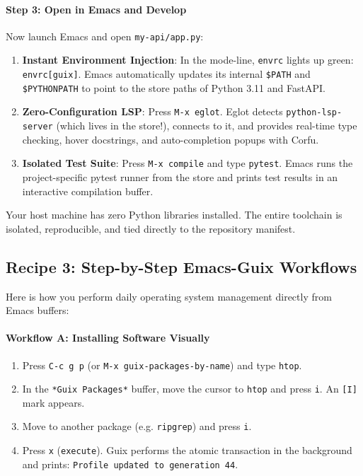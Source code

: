 \paragraph{Step 3: Open in Emacs and Develop}
Now launch Emacs and open \texttt{my-api/app.py}:
\begin{enumerate}
  \item \textbf{Instant Environment Injection}: In the mode-line, \texttt{envrc} lights up green: \texttt{envrc[guix]}. Emacs automatically updates its internal \texttt{\$PATH} and \texttt{\$PYTHONPATH} to point to the store paths of Python 3.11 and FastAPI.
  \item \textbf{Zero-Configuration LSP}: Press \texttt{M-x eglot}. Eglot detects \texttt{python-lsp-server} (which lives in the store!), connects to it, and provides real-time type checking, hover docstrings, and auto-completion popups with Corfu.
  \item \textbf{Isolated Test Suite}: Press \texttt{M-x compile} and type \texttt{pytest}. Emacs runs the project-specific pytest runner from the store and prints test results in an interactive compilation buffer.
\end{enumerate}

Your host machine has zero Python libraries installed. The entire toolchain is isolated, reproducible, and tied directly to the repository manifest.

\subsection{Recipe 3: Step-by-Step Emacs-Guix Workflows}

Here is how you perform daily operating system management directly from Emacs buffers:

\paragraph{Workflow A: Installing Software Visually}
\begin{enumerate}
  \item Press \texttt{C-c g p} (or \texttt{M-x guix-packages-by-name}) and type \texttt{htop}.
  \item In the \texttt{*Guix Packages*} buffer, move the cursor to \texttt{htop} and press \texttt{i}. An \texttt{[I]} mark appears.
  \item Move to another package (e.g. \texttt{ripgrep}) and press \texttt{i}.
  \item Press \texttt{x} (\texttt{execute}). Guix performs the atomic transaction in the background and prints: \texttt{Profile updated to generation 44}.
\end{enumerate}

